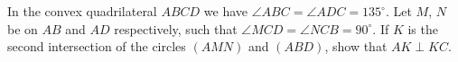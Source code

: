 In the convex quadrilateral $ABCD$ we have $\angle ABC = \angle ADC = 135^\circ$. Let $M$, $N$ be on $AB$ and $AD$ respectively, such that $\angle MCD = \angle NCB = 90^\circ$. If $K$ is the second intersection of the circles $(AMN)$ and $(ABD)$, show that $AK \perp KC$.
